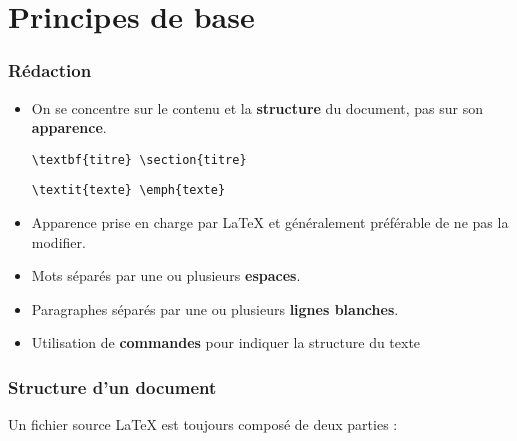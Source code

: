\section{Principes de base}


\begin{frame}

	\frametitle{Rédaction}
	
	\begin{itemize}
		\item On se concentre sur le contenu et la \textbf{structure} du document, pas
		sur son \textbf{apparence}.
		
		\texttt{\textbackslash textbf\{titre\} {\faArrowRight} \textbackslash section\{titre\}}
		
		\texttt{\textbackslash textit\{texte\} {\faArrowRight} \textbackslash emph\{texte\}}
		
		\item Apparence prise en charge par {\LaTeX} et généralement préférable	de ne pas la modifier.
		\item Mots séparés par une ou plusieurs \textbf{espaces}.
		\item Paragraphes séparés par une ou plusieurs \textbf{lignes blanches}.
		\item Utilisation de \textbf{commandes} pour indiquer la structure du texte
	\end{itemize}

\end{frame}


\begin{frame}[fragile]

	\frametitle{Structure d'un document}
	
	Un fichier source {\LaTeX} est toujours composé de deux parties :
	
	
\end{frame}

